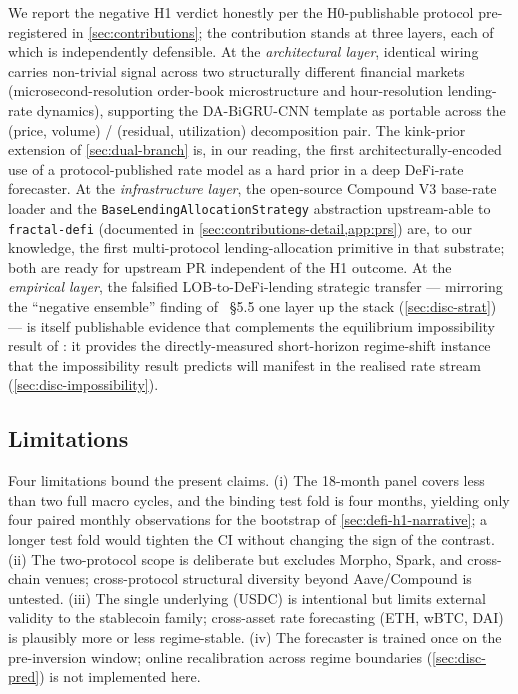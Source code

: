 We report the negative H1 verdict honestly per the H0-publishable
protocol pre-registered in \cref{sec:contributions}; the
contribution stands at three layers, each of which is independently
defensible. At the \emph{architectural layer}, identical wiring
carries non-trivial signal across two structurally different
financial markets (microsecond-resolution order-book microstructure
and hour-resolution lending-rate dynamics), supporting the
DA-BiGRU-CNN template as portable across the (price, volume) /
(residual, utilization) decomposition pair. The kink-prior
extension of \cref{sec:dual-branch} is, in our reading, the first
architecturally-encoded use of a protocol-published rate model as a
hard prior in a deep DeFi-rate forecaster. At the
\emph{infrastructure layer}, the open-source Compound V3 base-rate
loader and the \texttt{BaseLendingAllocationStrategy} abstraction
upstream-able to \texttt{fractal-defi} \cite{krestenko2026basis}
(documented in \cref{sec:contributions-detail,app:prs}) are, to
our knowledge, the first multi-protocol lending-allocation
primitive in that substrate; both are ready for upstream PR
independent of the H1 outcome. At the \emph{empirical layer}, the
falsified LOB-to-DeFi-lending strategic transfer ---
mirroring the ``negative ensemble'' finding of
\cite{solovev2026lob}~\S5.5 one layer up the stack
(\cref{sec:disc-strat}) --- is itself publishable evidence that
complements the equilibrium impossibility result of
\cite{halpern2024fairrates}: it provides the directly-measured
short-horizon regime-shift instance that the impossibility result
predicts will manifest in the realised rate stream
(\cref{sec:disc-impossibility}).

\subsection{Limitations}
\label{sec:limitations}

Four limitations bound the present claims. (i) The 18-month panel
covers less than two full macro cycles, and the binding test fold
is four months, yielding only four paired monthly observations for
the bootstrap of \cref{sec:defi-h1-narrative}; a longer test fold
would tighten the CI without changing the sign of the contrast.
(ii) The two-protocol scope is deliberate but excludes Morpho,
Spark, and cross-chain venues; cross-protocol structural diversity
beyond Aave/Compound is untested. (iii) The single underlying
(USDC) is intentional but limits external validity to the
stablecoin family; cross-asset rate forecasting (ETH, wBTC, DAI)
is plausibly more or less regime-stable. (iv) The forecaster is
trained once on the pre-inversion window; online recalibration
across regime boundaries (\cref{sec:disc-pred}) is not
implemented here.

